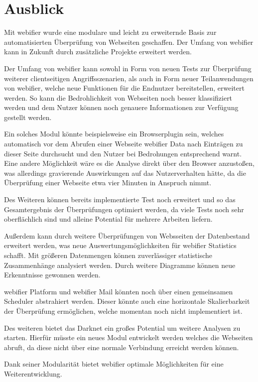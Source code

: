 \chapter{Ausblick}

Mit webifier wurde eine modulare und leicht zu erweiternde Basis zur automatisierten Überprüfung
von Webseiten geschaffen. Der Umfang von webifier kann in Zukunft durch zusätzliche Projekte
erweitert werden.

Der Umfang von webifier kann sowohl in Form von neuen Tests zur Überprüfung weiterer clientseitigen
Angriffsszenarien, als auch in Form neuer Teilanwendungen von webifier, welche neue Funktionen für
die Endnutzer bereitstellen, erweitert werden. So kann die Bedrohlichkeit von Webseiten noch besser
klassifiziert werden und dem Nutzer können noch genauere Informationen zur Verfügung gestellt
werden.

Ein solches Modul könnte beispielsweise ein Browserplugin sein, welches automatisch vor dem Abrufen
einer Webseite webifier Data nach Einträgen zu dieser Seite durchsucht und den Nutzer bei
Bedrohungen entsprechend warnt. Eine andere Möglichkeit wäre es die Analyse direkt über den Browser
anzustoßen, was allerdings gravierende Auswirkungen auf das Nutzerverhalten hätte, da die
Überprüfung einer Webseite etwa vier Minuten in Anspruch nimmt.

Des Weiteren können bereits implementierte Test noch erweitert und so das Gesamtergebnis der
Überprüfungen optimiert werden, da viele Tests noch sehr oberflächlich sind und alleine Potential
für mehrere Arbeiten liefern.

Außerdem kann durch weitere Überprüfungen von Websseiten der Datenbestand erweitert werden, was neue
Auswertungsmöglichkeiten für webifier Statistics schafft. Mit größeren Datenmengen können
zuverlässiger statistische Zusammenhänge analysiert werden. Durch weitere Diagramme können neue
Erkenntnisse gewonnen werden.

webifier Platform und webifier Mail könnten noch über einen gemeinsamen Scheduler abstrahiert
werden. Dieser könnte auch eine horizontale Skalierbarkeit der Überprüfung ermöglichen, welche
momentan noch nicht implementiert ist.

Des weiteren bietet das Darknet ein großes Potential um weitere Analysen zu starten. Hierfür
müsste ein neues Modul entwickelt werden welches die Webseiten abruft, da diese nicht über eine
normale Verbindung erreicht werden können.

Dank seiner Modularität bietet webifier optimale Möglichkeiten für eine Weiterentwicklung.